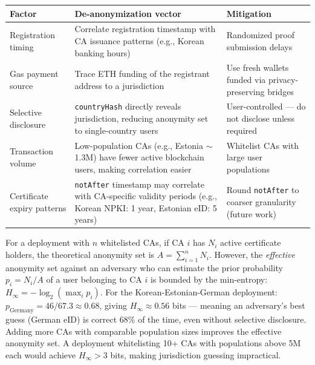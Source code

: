 \documentclass[11pt, a4paper]{article}
\begin{document}
\begin{longtable}[]{@{}
  >{\raggedright\arraybackslash}p{}
  >{\raggedright\arraybackslash}p{}
  >{\raggedright\arraybackslash}p{}@{}}
\toprule\noalign{}
\begin{minipage}[b]{\linewidth}\raggedright
Factor
\end{minipage} & \begin{minipage}[b]{\linewidth}\raggedright
De-anonymization vector
\end{minipage} & \begin{minipage}[b]{\linewidth}\raggedright
Mitigation
\end{minipage} \\
\midrule\noalign{}
\endhead
\bottomrule\noalign{}
\endlastfoot
Registration timing & Correlate registration timestamp with CA issuance
patterns (e.g., Korean banking hours) & Randomized proof submission
delays \\
Gas payment source & Trace ETH funding of the registrant address to a
jurisdiction & Use fresh wallets funded via privacy-preserving
bridges \\
Selective disclosure & \texttt{countryHash} directly reveals
jurisdiction, reducing anonymity set to single-country users &
User-controlled --- do not disclose unless required \\
Transaction volume & Low-population CAs (e.g., Estonia
$\sim$1.3M) have fewer active blockchain users, making
correlation easier & Whitelist CAs with large user populations \\
Certificate expiry patterns & \texttt{notAfter} timestamp may correlate
with CA-specific validity periods (e.g., Korean NPKI: 1 year, Estonian
eID: 5 years) & Round \texttt{notAfter} to coarser granularity (future
work) \\
\end{longtable}

For a deployment with \(n\) whitelisted CAs, if CA \(i\) has \(N_i\)
active certificate holders, the theoretical anonymity set is
\(A = \sum_{i=1}^{n} N_i\). However, the \emph{effective} anonymity set
against an adversary who can estimate the prior probability
\(p_i = N_i / A\) of a user belonging to CA \(i\) is bounded by the
min-entropy: \(H_\infty = -\log_2(\max_i p_i)\). For the
Korean-Estonian-German deployment:
\(p_{\text{Germany}} = 46/67.3 \approx 0.68\), giving
\(H_\infty \approx 0.56\) bits --- meaning an adversary's best guess
(German eID) is correct 68\% of the time, even without selective
disclosure. Adding more CAs with comparable population sizes improves
the effective anonymity set. A deployment whitelisting 10+ CAs with
populations above 5M each would achieve \(H_\infty > 3\) bits, making
jurisdiction guessing impractical.
\end{document}
